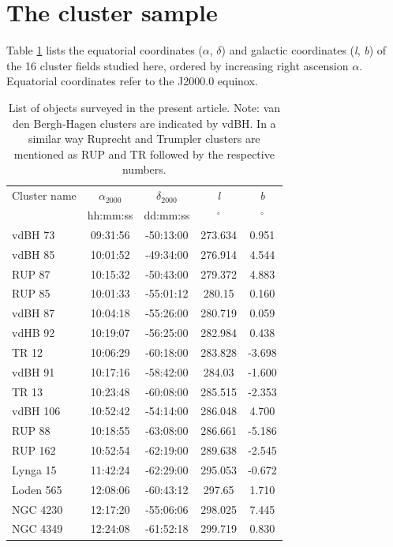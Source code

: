 \documentclass[referee]{aa}
\begin{document}
\section{The cluster sample}
\label{sec:clust_sample}

Table \ref{tab:clust_list} lists the equatorial coordinates ($\alpha$,
$\delta$) and galactic coordinates (\textit{l}, \textit{b}) of the 16 cluster
fields studied here,  ordered by increasing right ascension $\alpha$.
Equatorial coordinates refer to the J2000.0 equinox.

\begin{table}[ht]
    \centering
\caption{List of objects surveyed in the present article. Note: van den
Bergh-Hagen clusters \citep{vdBH1975} are indicated by vdBH. In a similar   
way Ruprecht \citep{Ruprecht_1996} and Trumpler \citep{Trumpler_1930} clusters
are mentioned as RUP and TR followed by the respective numbers.}
    \begin{tabular}{lcccc}
    \hline \hline 
        Cluster name & $\alpha_{2000}$ & $\delta_{2000}$ & \emph{l} & \emph{b}\\
         & hh:mm:ss & dd:mm:ss & $^\circ$ & $^\circ$\\
       \hline
        vdBH 73 & 09:31:56 & -50:13:00 & 273.634 & 0.951\\
        vdBH 85 & 10:01:52 & -49:34:00 & 276.914 & 4.544\\
        RUP 87 & 10:15:32 & -50:43:00 & 279.372 & 4.883\\
        RUP 85 & 10:01:33 & -55:01:12 & 280.15 & 0.160\\
        vdBH 87 & 10:04:18 & -55:26:00 & 280.719 & 0.059\\
        vdHB 92 & 10:19:07 & -56:25:00 & 282.984 & 0.438\\
        TR 12 & 10:06:29 & -60:18:00 & 283.828 & -3.698\\
        vdBH 91 & 10:17:16 & -58:42:00 & 284.03 & -1.600\\
        TR 13 & 10:23:48 & -60:08:00 & 285.515 & -2.353\\
        vdBH 106 & 10:52:42 & -54:14:00 & 286.048 & 4.700\\
        RUP 88 & 10:18:55 & -63:08:00 & 286.661 & -5.186\\
        RUP 162 & 10:52:54 & -62:19:00 & 289.638 & -2.545\\
        Lynga 15 & 11:42:24 & -62:29:00 & 295.053 & -0.672\\
        Loden 565 & 12:08:06 & -60:43:12 & 297.65 & 1.710\\
        NGC 4230 & 12:17:20 & -55:06:06 & 298.025 & 7.445\\
        NGC 4349 & 12:24:08 & -61:52:18 & 299.719 & 0.830\\
        \hline
    \end{tabular}
    \label{tab:clust_list}
\end{table}
\end{document}
